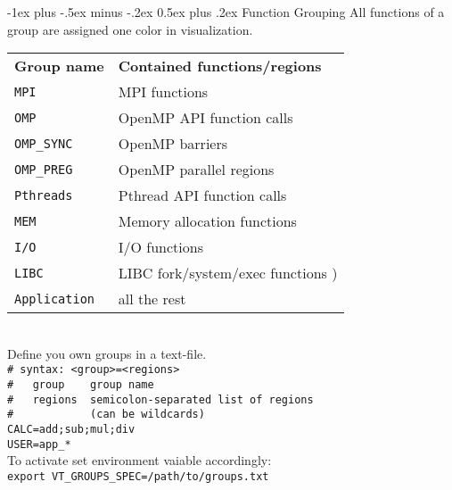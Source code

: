 \documentclass[letterpaper,10pt,landscape]{article}
\makeatletter
\renewcommand{\section}{\@startsection{section}{1}{0mm}%
                                {-1ex plus -.5ex minus -.2ex}%
                                {0.5ex plus .2ex}%
                                {\normalfont\large\bfseries}}
\makeatother
\begin{document}
\begin{multicols}{3}
\section{Function Grouping}
All functions of a group are assigned one color in visualization.
\begin{tabular}{@{}ll@{}}
\textbf{Group name} & \textbf{Contained functions/regions}\\
\texttt{MPI}  & MPI functions\\
\texttt{OMP}  & OpenMP API function calls\\
\texttt{OMP\_SYNC} & OpenMP barriers \\
\texttt{OMP\_PREG} & OpenMP parallel regions \\
\texttt{Pthreads} & Pthread API function calls \\
\texttt{MEM}  & Memory allocation functions \\
\texttt{I/O}  & I/O functions \\
\texttt{LIBC} & LIBC fork/system/exec functions )\\
\texttt{Application} & all the rest\\
\end{tabular}\\
Define you own groups in a text-file.\\
\verb!# syntax: <group>=<regions>!\\
\verb!#   group    group name !\\
\verb!#   regions  semicolon-separated list of regions!\\
\verb!#            (can be wildcards)!\\
\verb!CALC=add;sub;mul;div!\\
\verb!USER=app_*!\\
To activate set environment vaiable accordingly:\\
\texttt{export VT\_GROUPS\_SPEC=/path/to/groups.txt}\\





\end{multicols}
\end{document}
